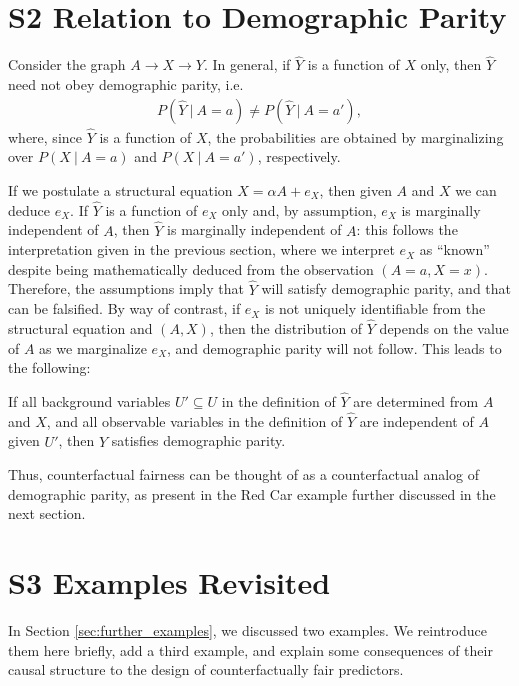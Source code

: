 \section*{S2 Relation to Demographic Parity}
%
Consider the graph $A \rightarrow X \rightarrow Y$. In general, if
$\hat Y$ is a function of $X$ only, then $\hat Y$ need not obey
demographic parity, i.e.
\begin{align}
  P(\hat Y\ |\ A = a) \neq P(\hat Y\ |\ A = a'),\nonumber
\end{align}
\noindent where, since $\hat Y$ is a function of $X$, the
probabilities are obtained by marginalizing over $P(X\ |\ A = a)$ and
$P(X\ |\ A = a')$, respectively.

If we postulate a structural equation $X = \alpha A + e_X$, then given
$A$ and $X$ we can deduce $e_X$. If $\hat Y$ is a function of $e_X$
only and, by assumption, $e_X$ is marginally independent of $A$, then
$\hat Y$ is marginally independent of $A$: this follows the
interpretation given in the previous section, where we interpret $e_X$
as ``known'' despite being mathematically deduced from the
observation $(A = a, X = x)$. Therefore, the assumptions imply that
$\hat Y$ will satisfy demographic parity, and that can be falsified.
By way of contrast, if $e_X$ is not uniquely identifiable from the
structural equation and $(A, X)$, then the distribution of $\hat Y$
depends on the value of $A$ as we marginalize $e_X$, and demographic
parity will not follow. This leads to the following:
%
\begin{lem}
If all background variables $U' \subseteq U$ in the definition of
$\hat Y$ are determined from $A$ and $X$,
and all observable variables in the definition of $\hat Y$ are
independent of $A$ given $U'$, then $\hat Y$ satisfies demographic
parity.
\end{lem}
Thus, counterfactual fairness can be thought of as a counterfactual
analog of demographic parity, as present in the Red Car example further discussed
in the next section.

\section*{S3 Examples Revisited}

In Section \ref{sec:further_examples}, we discussed two examples. We
reintroduce them here briefly, add a third example, and explain some
consequences of their causal structure to the design of
counterfactually fair predictors.

